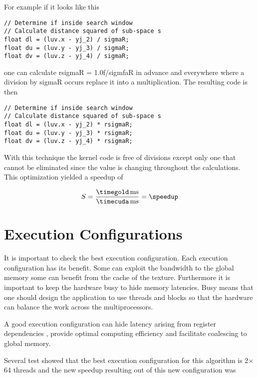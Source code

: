 For example if it looks like this
\begin{lstlisting}[caption=Expensive divison, label=lst:division]
// Determine if inside search window
// Calculate distance squared of sub-space s
float dl = (luv.x - yj_2) / sigmaR;               
float du = (luv.y - yj_3) / sigmaR;               
float dv = (luv.z - yj_4) / sigmaR;
\end{lstlisting}
one can calculate \textsf{rsigmaR} = 1.0f/\textsf{sigmfaR} in advance and everywhere where a
division by \textsf{sigmaR} occurs replace it into a multiplication. The
resulting code is then
\begin{lstlisting}[caption=Division turned into fast multiplication, label=lst:precalcdivision]
// Determine if inside search window
// Calculate distance squared of sub-space s
float dl = (luv.x - yj_2) * rsigmaR;               
float du = (luv.y - yj_3) * rsigmaR;               
float dv = (luv.z - yj_4) * rsigmaR;
\end{lstlisting}

With this technique the kernel code is free of divisions except only one that
cannot be eliminated since the value is changing throughout the calculations.
This optimization yielded a speedup of

\fpDiv{\speedup}{\timegold}{\timecuda}
\begin{equation*}\label{eq:speedup3}
	S = \frac{\unit[\timegold]{ms}}{\unit[\timecuda]{ms}} = \speedup
\end{equation*}


\section{Execution Configurations} %
\label{sec:run_configurations}
It is important to check the best execution configuration. Each execution
configuration has its benefit. Some can exploit the bandwidth to the global
memory some can benefit from the cache of the texture. Furthermore it is
important to keep the hardware busy to hide memory latencies. Busy means that
one should design the application to use threads and blocks so that the
hardware can balance the work across the multiprocessors.

A good execution configuration can hide latency arising from register
dependencies , provide optimal computing efficiency and facilitate coalescing to
global memory.

Several test showed that the best execution configuration for this algorithm is
2$\times$64 threads and the new speedup  resulting out of this new configuration
was

